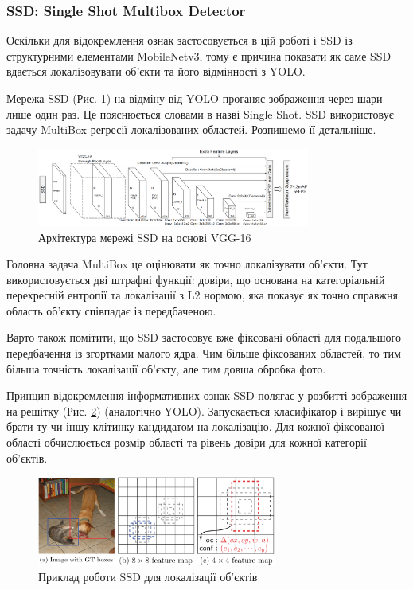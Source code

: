 \subsubsection{SSD: Single Shot Multibox Detector}

Оскільки для відокремлення ознак застосовується в цій роботі і SSD із
структурними елементами MobileNetv3, тому є причина показати як саме SSD вдається
локалізовувати об'єкти та його відмінності з YOLO.

Мережа SSD (Рис. \ref{fig:cnn:ssd_architecture}) на відміну від YOLO проганяє зображення
через шари лише один раз. Це пояснюється словами в назві Single Shot. SSD
використовує задачу MultiBox регресії
локалізованих областей. Розпишемо її детальніше.

\begin{figure}[H]
    \centering
    \includegraphics[width=0.8\textwidth]{images/cnn_ssd_architecture}
    \caption{Архітектура мережі SSD на основі VGG-16    \cite{ssd}
        \label{fig:cnn:ssd_architecture}
    }
\end{figure}

Головна задача MultiBox це оцінювати як точно локалізувати об'єкти. Тут використовується
дві штрафні функції: довіри, що основана на категоріальній перехресній ентропії та
локалізації з L2 нормою, яка показує як точно справжня область об'єкту співпадає
із передбаченою.

Варто також помітити, що SSD застосовує вже фіксовані області для подальшого передбачення
із згортками малого ядра.
Чим більше фіксованих областей, то тим більша точність локалізації об'єкту,
але тим довша обробка фото.

Принцип відокремлення інформативних ознак SSD полягає у розбитті зображення на решітку
(Рис. \ref{fig:cnn:ssd_work_example}) (аналогічно YOLO). Запускається класифікатор
і вирішує чи брати ту чи іншу клітинку
кандидатом на локалізацію. Для кожної фіксованої області обчислюється розмір
області та рівень довіри для кожної категорії об'єктів.

\begin{figure}[H]
    \centering
    \includegraphics[width=0.7\textwidth]{images/cnn_ssd_work_example}
    \caption{Приклад роботи SSD для локалізації об'єктів \cite{ssd}
        \label{fig:cnn:ssd_work_example}
    }
\end{figure}


\clearpage